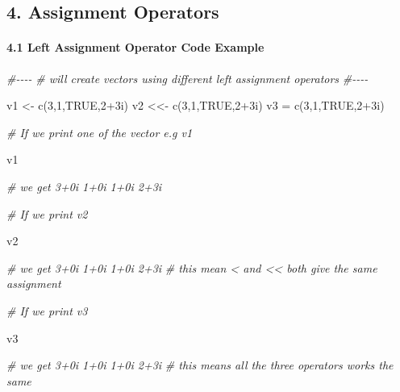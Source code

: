 \documentclass[
]{article}
\newenvironment{Shaded}{\begin{snugshade}}{\end{snugshade}}
\newcommand{\CommentTok}[1]{\textcolor[rgb]{0.56,0.35,0.01}{\textit{#1}}}
\newcommand{\ConstantTok}[1]{\textcolor[rgb]{0.00,0.00,0.00}{#1}}
\newcommand{\DecValTok}[1]{\textcolor[rgb]{0.00,0.00,0.81}{#1}}
\newcommand{\FunctionTok}[1]{\textcolor[rgb]{0.00,0.00,0.00}{#1}}
\newcommand{\NormalTok}[1]{#1}
\newcommand{\OtherTok}[1]{\textcolor[rgb]{0.56,0.35,0.01}{#1}}
\newcommand{\SpecialCharTok}[1]{\textcolor[rgb]{0.00,0.00,0.00}{#1}}
\begin{document}
\hypertarget{assignment-operators}{%
\subsection{4. Assignment Operators}\label{assignment-operators}}

\hypertarget{left-assignment-operator-code-example}{%
\paragraph{4.1 Left Assignment Operator Code
Example}\label{left-assignment-operator-code-example}}

\begin{Shaded}
\begin{Highlighting}[]

\CommentTok{\#{-}{-}{-}{-}}
\CommentTok{\# will create vectors using different left assignment operators}
\CommentTok{\#{-}{-}{-}{-}}

\NormalTok{v1 }\OtherTok{\textless{}{-}} \FunctionTok{c}\NormalTok{(}\DecValTok{3}\NormalTok{,}\DecValTok{1}\NormalTok{,}\ConstantTok{TRUE}\NormalTok{,}\DecValTok{2}\SpecialCharTok{+}\NormalTok{3i) }
\NormalTok{v2 }\OtherTok{\textless{}\textless{}{-}} \FunctionTok{c}\NormalTok{(}\DecValTok{3}\NormalTok{,}\DecValTok{1}\NormalTok{,}\ConstantTok{TRUE}\NormalTok{,}\DecValTok{2}\SpecialCharTok{+}\NormalTok{3i) }
\NormalTok{v3 }\OtherTok{=} \FunctionTok{c}\NormalTok{(}\DecValTok{3}\NormalTok{,}\DecValTok{1}\NormalTok{,}\ConstantTok{TRUE}\NormalTok{,}\DecValTok{2}\SpecialCharTok{+}\NormalTok{3i) }

\CommentTok{\# If we print one of the vector e.g v1}

\NormalTok{v1}

\CommentTok{\# we get 3+0i 1+0i 1+0i 2+3i}

\CommentTok{\# If we print v2}

\NormalTok{v2}

\CommentTok{\# we get 3+0i 1+0i 1+0i 2+3i}
\CommentTok{\# this mean \textquotesingle{}\textless{}\textquotesingle{} and \textquotesingle{}\textless{}\textless{}\textquotesingle{} both give the same assignment}

\CommentTok{\# If we print v3}

\NormalTok{v3}

\CommentTok{\# we get  3+0i 1+0i 1+0i 2+3i}
\CommentTok{\# this means all the three operators works the same}

\end{Highlighting}
\end{Shaded}
\end{document}
